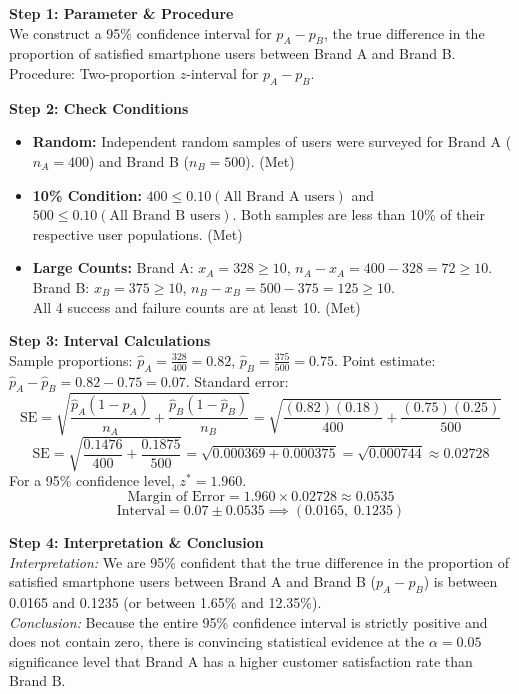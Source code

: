 \begin{frqrubricbox}
\textbf{Step 1: Parameter \& Procedure}\\
We construct a 95\% confidence interval for $p_A - p_B$, the true difference in the proportion of satisfied smartphone users between Brand A and Brand B. Procedure: Two-proportion $z$-interval for $p_A - p_B$.

\textbf{Step 2: Check Conditions}\\
\begin{itemize}
  \item \textbf{Random:} Independent random samples of users were surveyed for Brand A ($n_A = 400$) and Brand B ($n_B = 500$). (Met)
  \item \textbf{10\% Condition:} $400 \le 0.10(\text{All Brand A users})$ and $500 \le 0.10(\text{All Brand B users})$. Both samples are less than 10\% of their respective user populations. (Met)
  \item \textbf{Large Counts:} 
  Brand A: $x_A = 328 \ge 10$, $n_A - x_A = 400 - 328 = 72 \ge 10$.\\
  Brand B: $x_B = 375 \ge 10$, $n_B - x_B = 500 - 375 = 125 \ge 10$.\\
  All 4 success and failure counts are at least 10. (Met)
\end{itemize}

\textbf{Step 3: Interval Calculations}\\
Sample proportions: $\hat{p}_A = \frac{328}{400} = 0.82$, $\hat{p}_B = \frac{375}{500} = 0.75$.
Point estimate: $\hat{p}_A - \hat{p}_B = 0.82 - 0.75 = 0.07$.
Standard error:
\[ \text{SE} = \sqrt{\frac{\hat{p}_A(1 - \hat{p}_A)}{n_A} + \frac{\hat{p}_B(1 - \hat{p}_B)}{n_B}} = \sqrt{\frac{(0.82)(0.18)}{400} + \frac{(0.75)(0.25)}{500}} \]
\[ \text{SE} = \sqrt{\frac{0.1476}{400} + \frac{0.1875}{500}} = \sqrt{0.000369 + 0.000375} = \sqrt{0.000744} \approx 0.02728 \]
For a 95\% confidence level, $z^* = 1.960$.
\[ \text{Margin of Error} = 1.960 \times 0.02728 \approx 0.0535 \]
\[ \text{Interval} = 0.07 \pm 0.0535 \implies (0.0165, \; 0.1235) \]

\textbf{Step 4: Interpretation \& Conclusion}\\
\textit{Interpretation:} We are 95\% confident that the true difference in the proportion of satisfied smartphone users between Brand A and Brand B ($p_A - p_B$) is between 0.0165 and 0.1235 (or between 1.65\% and 12.35\%).\\
\textit{Conclusion:} Because the entire 95\% confidence interval is strictly positive and does not contain zero, there is convincing statistical evidence at the $\alpha = 0.05$ significance level that Brand A has a higher customer satisfaction rate than Brand B.


\end{frqrubricbox}
